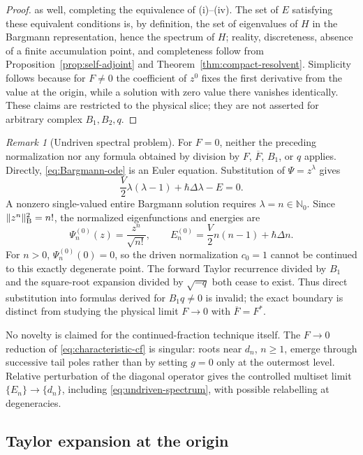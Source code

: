 \documentclass[11pt]{article}
\theoremstyle{remark}
\newtheorem{remark}[theorem]{Remark}
\newcommand{\Nzero}{\mathbb{N}_{0}}
\begin{document}
\begin{proof}
as well, completing the equivalence of (i)--(iv).  The set of \(E\)
satisfying these equivalent conditions is, by definition, the set of
eigenvalues of \(H\) in the Bargmann representation, hence the spectrum of
\(H\); reality, discreteness, absence of a finite accumulation point, and
completeness follow from Proposition~\ref{prop:self-adjoint} and
Theorem~\ref{thm:compact-resolvent}.  Simplicity follows because for \(F\ne0\) the
coefficient of \(z^0\) fixes the first derivative from the value at the
origin, while a solution with zero value there vanishes identically.  These
claims are restricted to the physical slice; they are not asserted for
arbitrary complex \(B_1,B_2,q\).
\end{proof}

\begin{remark}[Undriven spectral problem]
For \(F=0\), neither the preceding normalization nor any formula obtained by
division by \(F\), \(\overline F\), \(B_1\), or \(q\) applies.  Directly,
\eqref{eq:Bargmann-ode} is an Euler equation.  Substitution of
\(\Psi=z^\lambda\) gives
\[
 \frac V2\lambda(\lambda-1)+\hbar\Delta\lambda-E=0.
\]
A nonzero single-valued entire Bargmann solution requires
\(\lambda=n\in\Nzero\).  Since
\(\|z^n\|_{\rm B}^2=n!\), the normalized eigenfunctions and energies are
\begin{equation}
 \Psi_n^{(0)}(z)=\frac{z^n}{\sqrt{n!}},\qquad
 E_n^{(0)}=\frac V2n(n-1)+\hbar\Delta n.
 \label{eq:undriven-spectrum}
\end{equation}
For \(n>0\), \(\Psi_n^{(0)}(0)=0\), so the driven normalization \(c_0=1\)
cannot be continued to this exactly degenerate point.  The forward Taylor
recurrence divided by \(B_1\) and the square-root expansion divided by
\(\sqrt{-q}\) both cease to exist.  Thus direct substitution into formulas
derived for \(B_1q\ne0\) is invalid; the exact boundary is distinct from
studying the physical limit \(F\to0\) with \(\overline F=F^*\).
\end{remark}

No novelty is claimed for the continued-fraction technique itself.
The \(F\to0\) reduction of \eqref{eq:characteristic-cf} is singular: roots
near \(d_n\), \(n\ge1\), emerge
through successive tail poles rather than by setting \(g=0\) only at the
outermost level.  Relative perturbation of the diagonal operator gives the
controlled multiset limit \(\{E_n\}\to\{d_n\}\), including
\eqref{eq:undriven-spectrum}, with possible relabelling at degeneracies.

\subsection{Taylor expansion at the origin}
\end{document}
